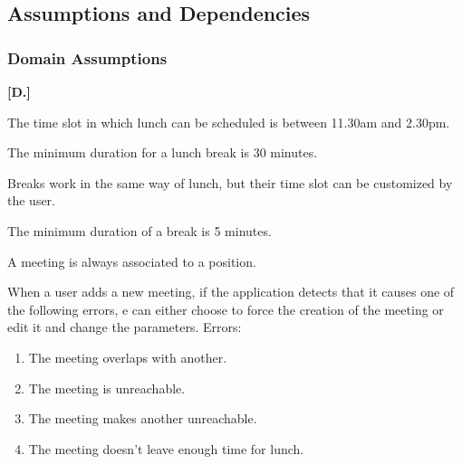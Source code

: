 \subsection{Assumptions and Dependencies}
\subsubsection{Domain Assumptions}
\begin{list}
{\bfseries{}[D.]~}
{
}
\item
The time slot in which lunch can be scheduled is between 11.30am and 2.30pm.
\item
The minimum duration for a lunch break is 30 minutes.
\item
Breaks work in the same way of lunch, but their time slot can be customized by the user.
\item
The minimum duration of a break is 5 minutes.
\item
A meeting is always associated to a position.
\item
When a user adds a new meeting, if the application detects that it causes one of the following errors, e can either choose to force the creation of the meeting or edit it and change the parameters.
Errors:
\begin{enumerate}
\item
The meeting overlaps with another.
\item
The meeting is unreachable.
\item
The meeting makes another unreachable.
\item
The meeting doesn't leave enough time for lunch.
\end{enumerate}


\end{list}
